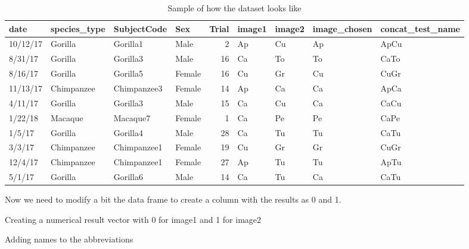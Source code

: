 \documentclass[
]{book}
\newenvironment{Shaded}{\begin{snugshade}}{\end{snugshade}}
\newcommand{\DataTypeTok}[1]{\textcolor[rgb]{0.13,0.29,0.53}{#1}}
\newcommand{\DecValTok}[1]{\textcolor[rgb]{0.00,0.00,0.81}{#1}}
\newcommand{\KeywordTok}[1]{\textcolor[rgb]{0.13,0.29,0.53}{\textbf{#1}}}
\newcommand{\NormalTok}[1]{#1}
\newcommand{\OperatorTok}[1]{\textcolor[rgb]{0.81,0.36,0.00}{\textbf{#1}}}
\newcommand{\StringTok}[1]{\textcolor[rgb]{0.31,0.60,0.02}{#1}}
\begin{document}
\begin{table}

\caption{\label{tab:unnamed-chunk-38}Sample of how the dataset looks like}
\centering
\begin{tabular}[t]{l|l|l|l|r|l|l|l|l}
\hline
date & species\_type & SubjectCode & Sex & Trial & image1 & image2 & image\_chosen & concat\_test\_name\\
\hline
10/12/17 & Gorilla & Gorilla1 & Male & 2 & Ap & Cu & Ap & ApCu\\
\hline
8/31/17 & Gorilla & Gorilla3 & Male & 16 & Ca & To & To & CaTo\\
\hline
8/16/17 & Gorilla & Gorilla5 & Female & 16 & Cu & Gr & Cu & CuGr\\
\hline
11/13/17 & Chimpanzee & Chimpanzee3 & Female & 14 & Ap & Ca & Ca & ApCa\\
\hline
4/11/17 & Gorilla & Gorilla3 & Male & 15 & Ca & Cu & Ca & CaCu\\
\hline
1/22/18 & Macaque & Macaque7 & Female & 1 & Ca & Pe & Pe & CaPe\\
\hline
1/5/17 & Gorilla & Gorilla4 & Male & 28 & Ca & Tu & Tu & CaTu\\
\hline
3/3/17 & Chimpanzee & Chimpanzee1 & Female & 19 & Cu & Gr & Gr & CuGr\\
\hline
12/4/17 & Chimpanzee & Chimpanzee1 & Female & 27 & Ap & Tu & Tu & ApTu\\
\hline
5/1/17 & Gorilla & Gorilla6 & Male & 14 & Ca & Tu & Ca & CaTu\\
\hline
\end{tabular}
\end{table}

Now we need to modify a bit the data frame to create a column with the results as 0 and 1.

Creating a numerical result vector with 0 for image1 and 1 for image2

\begin{Shaded}
\end{Shaded}

Adding names to the abbreviations
\end{document}
